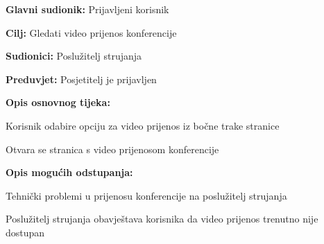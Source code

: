 					\noindent {}
					\begin{packed_item}
						
						\item \textbf{Glavni sudionik: } Prijavljeni korisnik
						\item  \textbf{Cilj:} Gledati video prijenos konferencije
						\item  \textbf{Sudionici:} Poslužitelj strujanja
						\item  \textbf{Preduvjet:} Posjetitelj je prijavljen
						\item  \textbf{Opis osnovnog tijeka:}
						
						\item[] \begin{packed_enum}
							
							\item Korisnik odabire opciju za video prijenos iz bočne trake stranice
							\item Otvara se stranica s video prijenosom konferencije
							
						\end{packed_enum}
						
						\item  \textbf{Opis mogućih odstupanja:}
						
						\item[] \begin{packed_item}
							
							\item[2.a] Tehnički problemi u prijenosu konferencije na poslužitelj strujanja
							\item[] \begin{packed_enum}
								
								\item Poslužitelj strujanja obavještava korisnika da video prijenos trenutno nije dostupan
								
							\end{packed_enum}
							
						\end{packed_item}
					\end{packed_item}
					
